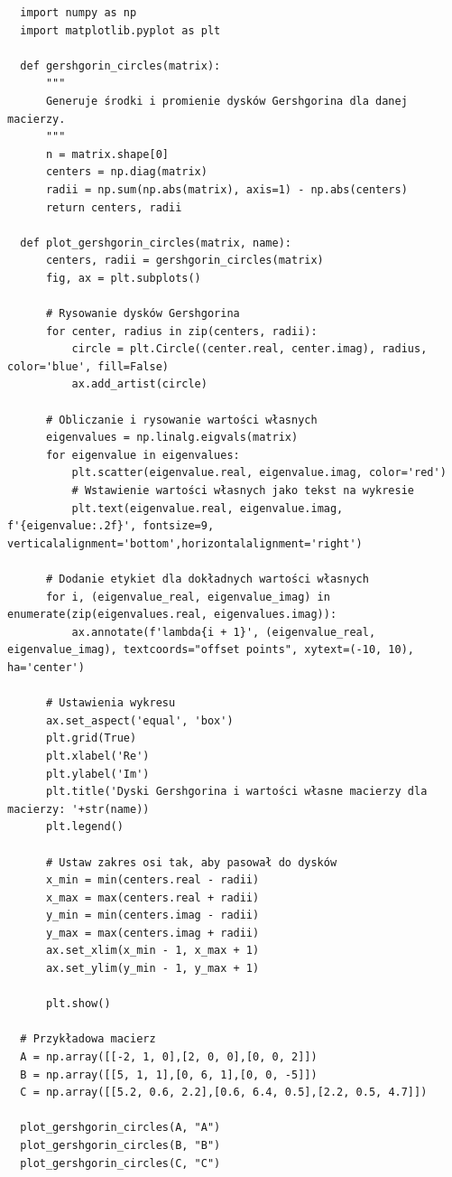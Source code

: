 \documentclass{article}
\begin{document}
\begin{lstlisting}
  import numpy as np
  import matplotlib.pyplot as plt
  
  def gershgorin_circles(matrix):
      """
      Generuje środki i promienie dysków Gershgorina dla danej macierzy.
      """
      n = matrix.shape[0]
      centers = np.diag(matrix)
      radii = np.sum(np.abs(matrix), axis=1) - np.abs(centers)
      return centers, radii
  
  def plot_gershgorin_circles(matrix, name):
      centers, radii = gershgorin_circles(matrix)
      fig, ax = plt.subplots()
  
      # Rysowanie dysków Gershgorina
      for center, radius in zip(centers, radii):
          circle = plt.Circle((center.real, center.imag), radius, color='blue', fill=False)
          ax.add_artist(circle)
  
      # Obliczanie i rysowanie wartości własnych
      eigenvalues = np.linalg.eigvals(matrix)
      for eigenvalue in eigenvalues:
          plt.scatter(eigenvalue.real, eigenvalue.imag, color='red')
          # Wstawienie wartości własnych jako tekst na wykresie
          plt.text(eigenvalue.real, eigenvalue.imag, f'{eigenvalue:.2f}', fontsize=9, verticalalignment='bottom',horizontalalignment='right')
  
      # Dodanie etykiet dla dokładnych wartości własnych
      for i, (eigenvalue_real, eigenvalue_imag) in enumerate(zip(eigenvalues.real, eigenvalues.imag)):
          ax.annotate(f'lambda{i + 1}', (eigenvalue_real, eigenvalue_imag), textcoords="offset points", xytext=(-10, 10), ha='center')
  
      # Ustawienia wykresu
      ax.set_aspect('equal', 'box')
      plt.grid(True)
      plt.xlabel('Re')
      plt.ylabel('Im')
      plt.title('Dyski Gershgorina i wartości własne macierzy dla macierzy: '+str(name))
      plt.legend()
  
      # Ustaw zakres osi tak, aby pasował do dysków
      x_min = min(centers.real - radii)
      x_max = max(centers.real + radii)
      y_min = min(centers.imag - radii)
      y_max = max(centers.imag + radii)
      ax.set_xlim(x_min - 1, x_max + 1)
      ax.set_ylim(y_min - 1, y_max + 1)
  
      plt.show()
      
  # Przykładowa macierz
  A = np.array([[-2, 1, 0],[2, 0, 0],[0, 0, 2]])
  B = np.array([[5, 1, 1],[0, 6, 1],[0, 0, -5]])
  C = np.array([[5.2, 0.6, 2.2],[0.6, 6.4, 0.5],[2.2, 0.5, 4.7]])
  
  plot_gershgorin_circles(A, "A")
  plot_gershgorin_circles(B, "B")
  plot_gershgorin_circles(C, "C")

\end{lstlisting}
\end{document}
